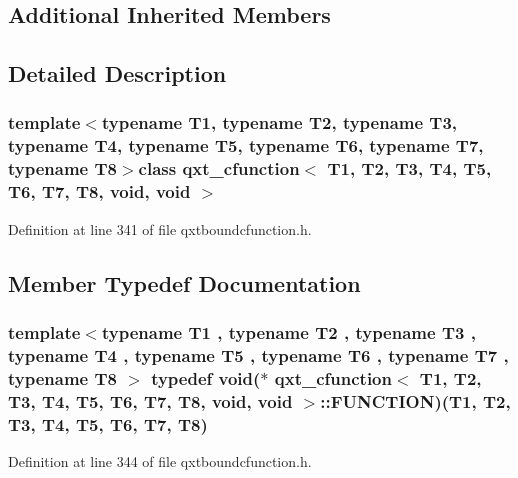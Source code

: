 \subsection*{Additional Inherited Members}


\subsection{Detailed Description}
\subsubsection*{template$<$typename T1, typename T2, typename T3, typename T4, typename T5, typename T6, typename T7, typename T8$>$class qxt\-\_\-cfunction$<$ T1, T2, T3, T4, T5, T6, T7, T8, void, void $>$}



Definition at line 341 of file qxtboundcfunction.\-h.



\subsection{Member Typedef Documentation}
\hypertarget{classqxt__cfunction_3_01_t1_00_01_t2_00_01_t3_00_01_t4_00_01_t5_00_01_t6_00_01_t7_00_01_t8_00_01void_00_01void_01_4_a1e8d33330533f752bf5ed50e5508229c}{
\subsubsection[{F\-U\-N\-C\-T\-I\-O\-N}]{\setlength{\rightskip}{0pt plus 5cm}template$<$typename T1 , typename T2 , typename T3 , typename T4 , typename T5 , typename T6 , typename T7 , typename T8 $>$ typedef {\bf void}($\ast$ {\bf qxt\-\_\-cfunction}$<$ T1, T2, T3, T4, T5, T6, T7, T8, {\bf void}, {\bf void} $>$\-::F\-U\-N\-C\-T\-I\-O\-N)(T1, T2, T3, T4, T5, T6, T7, T8)}}\label{classqxt__cfunction_3_01_t1_00_01_t2_00_01_t3_00_01_t4_00_01_t5_00_01_t6_00_01_t7_00_01_t8_00_01void_00_01void_01_4_a1e8d33330533f752bf5ed50e5508229c}


Definition at line 344 of file qxtboundcfunction.\-h.



